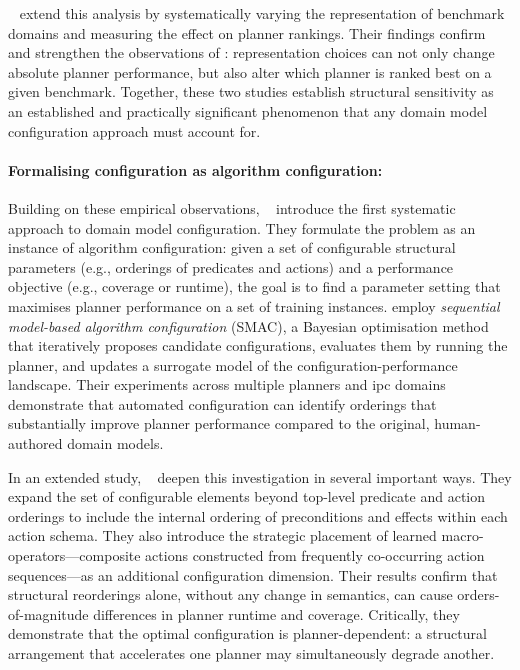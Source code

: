 \citeauthor{RiddleHolteBarley2011}~\cite{RiddleHolteBarley2011} extend this analysis by systematically varying the representation of benchmark domains and measuring the effect on planner rankings.
Their findings confirm and strengthen the observations of \citeauthor{HoweDahlman2002}: representation choices can not only change absolute planner performance, but also alter which planner is ranked best on a given benchmark.
Together, these two studies establish structural sensitivity as an established and practically significant phenomenon that any domain model configuration approach must account for.

\paragraph{Formalising configuration as algorithm configuration:}
Building on these empirical observations, \citeauthor{Vallati2015}~\cite{Vallati2015} introduce the first systematic approach to domain model configuration.
They formulate the problem as an instance of algorithm configuration: given a set of configurable structural parameters (e.g., orderings of predicates and actions) and a performance objective (e.g., coverage or runtime), the goal is to find a parameter setting that maximises planner performance on a set of training instances.
\citeauthor{Vallati2015} employ \emph{sequential model-based algorithm configuration} (SMAC), a Bayesian optimisation method that iteratively proposes candidate configurations, evaluates them by running the planner, and updates a surrogate model of the configuration-performance landscape.
Their experiments across multiple planners and \gls{ipc} domains demonstrate that automated configuration can identify orderings that substantially improve planner performance compared to the original, human-authored domain models.

In an extended study, \citeauthor{Vallati2021}~\cite{Vallati2021} deepen this investigation in several important ways.
They expand the set of configurable elements beyond top-level predicate and action orderings to include the internal ordering of preconditions and effects within each action schema.
They also introduce the strategic placement of learned macro-operators---composite actions constructed from frequently co-occurring action sequences---as an additional configuration dimension.
Their results confirm that structural reorderings alone, without any change in semantics, can cause orders-of-magnitude differences in planner runtime and coverage.
Critically, they demonstrate that the optimal configuration is planner-dependent: a structural arrangement that accelerates one planner may simultaneously degrade another.

